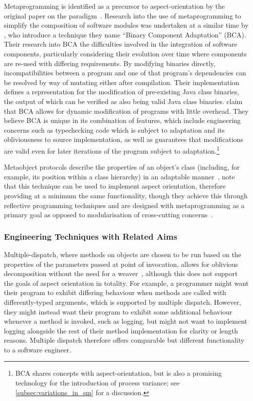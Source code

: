Metaprogramming is identified as a precursor to aspect-orientation by the
original paper on the paradigm~\cite{kiczales1997aspect}. Research into the use
of metaprogramming to simplify the composition of software modules was
undertaken at a similar time by \citet{keller1998binary}, who introduce a
technique they name ``Binary Component Adaptation'' (BCA). Their research into
BCA the difficulties involved in the integration of software components,
particularly considering their evolution over time where components are re-used
with differing requirements. By modifying binaries directly, incompatibilities
between a program and one of that program's dependencies can be resolved by way
of mutating either after compilation. Their implementation defines a
representation for the modification of pre-existing Java class binaries, the
output of which can be verified as also being valid Java class binaries.
 claim that BCA allows for dynamic modification of
programs with little overhead. They believe BCA is unique in its combination of
features, which include engineering concerns such as typechecking code which is
subject to adaptation and its obliviousness to source implementation, as well as
guarantees that modifications are valid even for later iterations of the program
subject to adaptation.\footnote{BCA shares concepts with aspect-orientation, but
  is also a promising technology for the introduction of process variance; see
  \cref{subsec:variations_in_sm} for a discussion.}

Metaobject protocols describe the properties of an object's class (including,
for example, its position within a class hierarchy) in an adaptable
manner~\cite{kiczales1991art}. \citet{espakaspect} note that this technique can
be used to implement aspect orientation, therefore providing at a minimum the
same functionality, though they achieve this through reflective programming
techniques and are designed with metaprogramming as a primary goal as opposed to
modularisation of cross-cutting
concerns~\cite{kiczales1991art,sullivan2001aspect}.

\subsubsection{Engineering Techniques with Related Aims}
\label{engineering_techniques_as_aop_alternative}

Multiple-dispatch, where methods on objects are chosen to be run based on the
properties of the parameters passed at point of invocation, allows for oblivious
decomposition without the need for a weaver~\cite{dozsa2008lisp}, although this
does not support the goals of aspect orientation in totality. For example, a
programmer might want their program to exhibit differing behaviour when methods
are called with differently-typed arguments, which is supported by multiple
dispatch. However, they might instead want their program to exhibit some
additional behaviour whenever a method is invoked, such as logging, but might
not want to implement logging alongside the rest of their method implementation
for clarity or length reasons. Multiple dispatch therefore offers comparable but
different functionality to a software engineer.

